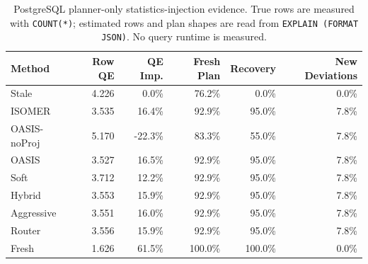 \begin{table}[t]
  \centering
  \small
  \caption{PostgreSQL planner-only statistics-injection evidence. True rows are measured with \texttt{COUNT(*)}; estimated rows and plan shapes are read from \texttt{EXPLAIN (FORMAT JSON)}. No query runtime is measured.}
  \label{tab:postgres_planner_stats_injection}
  \setlength{\tabcolsep}{4pt}
  \begin{tabular}{lrrrrr}
    \toprule
    Method & Row QE & QE Imp. & Fresh Plan & Recovery & New Deviations \\
    \midrule
    Stale & 4.226 & 0.0\% & 76.2\% & 0.0\% & 0.0\% \\
    ISOMER & 3.535 & 16.4\% & 92.9\% & 95.0\% & 7.8\% \\
    OASIS-noProj & 5.170 & -22.3\% & 83.3\% & 55.0\% & 7.8\% \\
    OASIS & 3.527 & 16.5\% & 92.9\% & 95.0\% & 7.8\% \\
    Soft & 3.712 & 12.2\% & 92.9\% & 95.0\% & 7.8\% \\
    Hybrid & 3.553 & 15.9\% & 92.9\% & 95.0\% & 7.8\% \\
    Aggressive & 3.551 & 16.0\% & 92.9\% & 95.0\% & 7.8\% \\
    Router & 3.556 & 15.9\% & 92.9\% & 95.0\% & 7.8\% \\
    Fresh & 1.626 & 61.5\% & 100.0\% & 100.0\% & 0.0\% \\
    \bottomrule
  \end{tabular}
\end{table}
